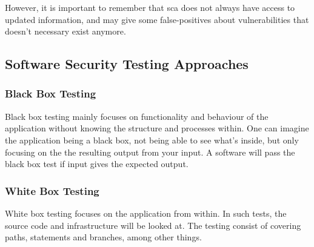 However, it is important to remember that \acrshort{sca} does not always have access to updated information, and may give some false-positives about vulnerabilities that doesn't necessary exist anymore. 

\subsection{Software Security Testing Approaches}
\subsubsection{Black Box Testing}
Black box testing mainly focuses on functionality and behaviour of the application without knowing the structure and processes within. One can imagine the application being a black box, not being able to see what's inside, but only focusing on the the resulting output from your input. A software will pass the black box test if input gives the expected output. \cite{blackbox}

\subsubsection{White Box Testing}
White box testing focuses on the application from within. In such tests, the source code and infrastructure will be looked at. The testing consist of covering paths, statements and branches, among other things. 

